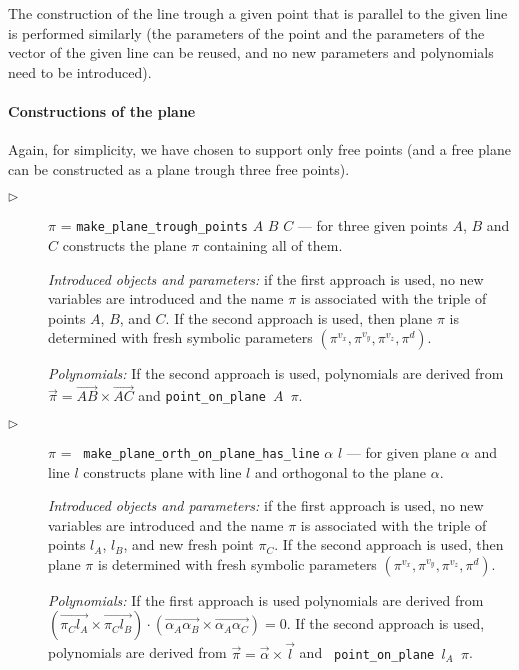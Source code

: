 \documentclass[final,1p,times,authoryear]{elsarticle}
\begin{document}
The construction of the line trough a given point that is parallel to
the given line is performed similarly (the parameters of the point and
the parameters of the vector of the given line can be reused, and no
new parameters and polynomials need to be introduced).


\paragraph{Constructions of the plane}
Again, for simplicity, we have chosen to support only free points (and
a free plane can be constructed as a plane trough three free points).

\begin{description}
\item[$\triangleright$] $\pi$ = {\tt make\_plane\_trough\_points} $A$
  $B$ $C$ --- for three given points $A$, $B$ and $C$ constructs the
  plane $\pi$ containing all of them.

  {\em Introduced objects and parameters:} if the first approach is
  used, no new variables are introduced and the name $\pi$ is
  associated with the triple of points $A$, $B$, and $C$. If the
  second approach is used, then plane $\pi$ is determined with fresh
  symbolic parameters $(\pi^{v_x}, \pi^{v_y}, \pi^{v_z}, \pi^{d})$.

  {\em Polynomials:} If the second approach is used, polynomials are
  derived from
  $\overrightarrow{\pi} = \overrightarrow{AB} \times
  \overrightarrow{AC}$ and {\tt point\_on\_plane $A$ $\pi$}.


\item[$\triangleright$] $\pi$ = {\tt
  make\_plane\_orth\_on\_plane\_has\_line} $\alpha$ $l$ --- for given
  plane $\alpha$ and line $l$ constructs plane with line $l$ and
  orthogonal to the plane $\alpha$.

  {\em Introduced objects and parameters:} if the first approach is
  used, no new variables are introduced and the name $\pi$ is
  associated with the triple of points $l_A$, $l_B$, and new fresh
  point $\pi_C$. If the second approach is used, then plane $\pi$ is
  determined with fresh symbolic parameters $(\pi^{v_x}, \pi^{v_y},
  \pi^{v_z}, \pi^{d})$.

  {\em Polynomials:} If the first approach is used polynomials are
  derived from $(\overrightarrow{\pi_Cl_A} \times
  \overrightarrow{\pi_Cl_B}) \cdot (\overrightarrow{\alpha_A\alpha_B}
  \times \overrightarrow{\alpha_A\alpha_C}) = 0$. If the second
  approach is used, polynomials are derived from $\overrightarrow{\pi}
  = \overrightarrow{\alpha} \times \overrightarrow{l}$ and {\tt
    point\_on\_plane $l_A$ $\pi$}.

\end{description}
\end{document}
